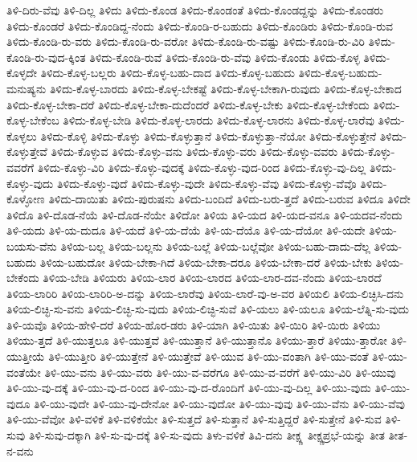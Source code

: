 {ತಿಳಿ-ದಿರು-ವೆವು
ತಿಳಿ-ದಿಲ್ಲ
ತಿಳಿದು
ತಿಳಿದು-ಕೊಂಡ
ತಿಳಿದು-ಕೊಂಡಂತೆ
ತಿಳಿದು-ಕೊಂಡದ್ದನ್ನು
ತಿಳಿದು-ಕೊಂಡರು
ತಿಳಿದು-ಕೊಂಡರೆ
ತಿಳಿದು-ಕೊಂಡಿದ್ದ-ನೆಂದು
ತಿಳಿದು-ಕೊಂಡಿ-ರ-ಬಹುದು
ತಿಳಿದು-ಕೊಂಡಿರು
ತಿಳಿದು-ಕೊಂಡಿ-ರುವ
ತಿಳಿದು-ಕೊಂಡಿ-ರು-ವರು
ತಿಳಿದು-ಕೊಂಡಿ-ರು-ವರೋ
ತಿಳಿದು-ಕೊಂಡಿ-ರು-ವಷ್ಟು
ತಿಳಿದು-ಕೊಂಡಿ-ರು-ವಿರಿ
ತಿಳಿದು-ಕೊಂಡಿ-ರು-ವುದ-ಕ್ಕಿಂತ
ತಿಳಿದು-ಕೊಂಡಿ-ರುವೆ
ತಿಳಿದು-ಕೊಂಡಿ-ರು-ವೆವು
ತಿಳಿದು-ಕೊಂಡು
ತಿಳಿದು-ಕೊಳ್ಳ
ತಿಳಿದು-ಕೊಳ್ಳದೇ
ತಿಳಿದು-ಕೊಳ್ಳ-ಬಲ್ಲರು
ತಿಳಿದು-ಕೊಳ್ಳ-ಬಹು-ದಾದ
ತಿಳಿದು-ಕೊಳ್ಳ-ಬಹುದು
ತಿಳಿದು-ಕೊಳ್ಳ-ಬಹುದು-ಮನುಷ್ಯನು
ತಿಳಿದು-ಕೊಳ್ಳ-ಬಾರದು
ತಿಳಿದು-ಕೊಳ್ಳ-ಬೇಕಷ್ಟೆ
ತಿಳಿದು-ಕೊಳ್ಳ-ಬೇಕಾಗಿ-ರುವುದು
ತಿಳಿದು-ಕೊಳ್ಳ-ಬೇಕಾದ
ತಿಳಿದು-ಕೊಳ್ಳ-ಬೇಕಾ-ದರೆ
ತಿಳಿದು-ಕೊಳ್ಳ-ಬೇಕಾ-ದುದೆಂದರೆ
ತಿಳಿದು-ಕೊಳ್ಳ-ಬೇಕು
ತಿಳಿದು-ಕೊಳ್ಳ-ಬೇಕೆಂದು
ತಿಳಿದು-ಕೊಳ್ಳ-ಬೇಕೆಂಬ
ತಿಳಿದು-ಕೊಳ್ಳ-ಬೇಡಿ
ತಿಳಿದು-ಕೊಳ್ಳ-ಲಾರದು
ತಿಳಿದು-ಕೊಳ್ಳ-ಲಾರನು
ತಿಳಿದು-ಕೊಳ್ಳ-ಲಾರೆವು
ತಿಳಿದು-ಕೊಳ್ಳಲು
ತಿಳಿದು-ಕೊಳ್ಳಿ
ತಿಳಿದು-ಕೊಳ್ಳು
ತಿಳಿದು-ಕೊಳ್ಳುತ್ತಾನೆ
ತಿಳಿದು-ಕೊಳ್ಳುತ್ತಾ-ನೆಯೋ
ತಿಳಿದು-ಕೊಳ್ಳುತ್ತೇನೆ
ತಿಳಿದು-ಕೊಳ್ಳುತ್ತೇವೆ
ತಿಳಿದು-ಕೊಳ್ಳುವ
ತಿಳಿದು-ಕೊಳ್ಳು-ವನು
ತಿಳಿದು-ಕೊಳ್ಳು-ವರು
ತಿಳಿದು-ಕೊಳ್ಳು-ವವರು
ತಿಳಿದು-ಕೊಳ್ಳು-ವವರೆಗೆ
ತಿಳಿದು-ಕೊಳ್ಳು-ವಿರಿ
ತಿಳಿದು-ಕೊಳ್ಳು-ವುದಕ್ಕೆ
ತಿಳಿದು-ಕೊಳ್ಳು-ವುದ-ರಿಂದ
ತಿಳಿದು-ಕೊಳ್ಳು-ವು-ದಿಲ್ಲ
ತಿಳಿದು-ಕೊಳ್ಳು-ವುದು
ತಿಳಿದು-ಕೊಳ್ಳು-ವುದೆ
ತಿಳಿದು-ಕೊಳ್ಳು-ವುದೇ
ತಿಳಿದು-ಕೊಳ್ಳು-ವೆವು
ತಿಳಿದು-ಕೊಳ್ಳು-ವೆವೊ
ತಿಳಿದು-ಕೊಳ್ಳೋಣ
ತಿಳಿದು-ದಾಯಿತು
ತಿಳಿದು-ಪುರುಷನು
ತಿಳಿದು-ಬಂದಿದೆ
ತಿಳಿದು-ಬರು-ತ್ತದೆ
ತಿಳಿದು-ಬರುವ
ತಿಳಿದೂ
ತಿಳಿದೇ
ತಿಳಿದೊ
ತಿಳಿ-ದೊಡ-ನೆಯೆ
ತಿಳಿ-ದೊಡ-ನೆಯೇ
ತಿಳಿದೋ
ತಿಳಿಯ
ತಿಳಿ-ಯದ
ತಿಳಿ-ಯದ-ವನೂ
ತಿಳಿ-ಯದವ-ನೆಂದು
ತಿಳಿ-ಯದು
ತಿಳಿ-ಯ-ದುದೂ
ತಿಳಿ-ಯದೆ
ತಿಳಿ-ಯ-ದೆಯೆ
ತಿಳಿ-ಯ-ದೆಯೊ
ತಿಳಿ-ಯ-ದೆಯೋ
ತಿಳಿ-ಯದೇ
ತಿಳಿಯ-ಬಯಸು-ವೆನು
ತಿಳಿಯ-ಬಲ್ಲ
ತಿಳಿಯ-ಬಲ್ಲನು
ತಿಳಿಯ-ಬಲ್ಲೆ
ತಿಳಿಯ-ಬಲ್ಲೆವೋ
ತಿಳಿಯ-ಬಹು-ದಾದು-ದೆಲ್ಲ
ತಿಳಿಯ-ಬಹುದು
ತಿಳಿಯ-ಬಹುದೋ
ತಿಳಿಯ-ಬೇಕಾ-ಗಿದೆ
ತಿಳಿಯ-ಬೇಕಾ-ದರೂ
ತಿಳಿಯ-ಬೇಕಾ-ದರೆ
ತಿಳಿಯ-ಬೇಕು
ತಿಳಿಯ-ಬೇಕೆಂದು
ತಿಳಿಯ-ಬೇಡಿ
ತಿಳಿಯರು
ತಿಳಿಯ-ಲಾರ
ತಿಳಿಯ-ಲಾರದ
ತಿಳಿಯ-ಲಾರ-ದವ-ನೆಂದು
ತಿಳಿಯ-ಲಾರದೆ
ತಿಳಿಯ-ಲಾರಿರಿ
ತಿಳಿಯ-ಲಾರಿರಿ-ಅ-ದನ್ನು
ತಿಳಿಯ-ಲಾರೆವು
ತಿಳಿಯ-ಲಾರೆ-ವು-ಅ-ವರ
ತಿಳಿಯಲಿ
ತಿಳಿಯ-ಲಿಚ್ಛಿಸಿ-ದನು
ತಿಳಿಯ-ಲಿಚ್ಛಿ-ಸು-ವನು
ತಿಳಿಯ-ಲಿಚ್ಛಿ-ಸು-ವುದು
ತಿಳಿಯ-ಲಿಚ್ಛಿ-ಸುವೆ
ತಿಳಿ-ಯಲು
ತಿಳಿ-ಯಲೂ
ತಿಳಿಯ-ಲೆತ್ನಿ-ಸು-ವುದು
ತಿಳಿ-ಯವೊ
ತಿಳಿಯ-ಹೇಳಿ-ದರೆ
ತಿಳಿಯ-ಹೊರ-ಡರು
ತಿಳಿ-ಯಾಗಿ
ತಿಳಿ-ಯಿತು
ತಿಳಿ-ಯಿರಿ
ತಿಳಿ-ಯಿರು
ತಿಳಿಯು
ತಿಳಿಯು-ತ್ತದೆ
ತಿಳಿ-ಯುತ್ತಲೂ
ತಿಳಿ-ಯುತ್ತವೆ
ತಿಳಿ-ಯುತ್ತಾನೆ
ತಿಳಿ-ಯುತ್ತಾನೊ
ತಿಳಿಯು-ತ್ತಾರೆ
ತಿಳಿಯು-ತ್ತಾರೋ
ತಿಳಿ-ಯುತ್ತೀಯೆ
ತಿಳಿ-ಯುತ್ತೀರಿ
ತಿಳಿ-ಯುತ್ತೇನೆ
ತಿಳಿ-ಯುತ್ತೇವೆ
ತಿಳಿ-ಯುವ
ತಿಳಿ-ಯು-ವಂತಾಗಿ
ತಿಳಿ-ಯು-ವಂತೆ
ತಿಳಿ-ಯು-ವಂತೆಯೇ
ತಿಳಿ-ಯು-ವನು
ತಿಳಿ-ಯು-ವರು
ತಿಳಿ-ಯು-ವ-ವರೆಗೂ
ತಿಳಿ-ಯು-ವ-ವರೆಗೆ
ತಿಳಿ-ಯು-ವಿರಿ
ತಿಳಿ-ಯುವು
ತಿಳಿ-ಯು-ವು-ದಕ್ಕೆ
ತಿಳಿ-ಯು-ವು-ದ-ರಿಂದ
ತಿಳಿ-ಯು-ವು-ದ-ರೊಂದಿಗೆ
ತಿಳಿ-ಯು-ವು-ದಿಲ್ಲ
ತಿಳಿ-ಯು-ವುದು
ತಿಳಿ-ಯು-ವುದೂ
ತಿಳಿ-ಯು-ವುದೇ
ತಿಳಿ-ಯು-ವು-ದೇನೋ
ತಿಳಿ-ಯು-ವುದೋ
ತಿಳಿ-ಯು-ವುವು
ತಿಳಿ-ಯು-ವೆನು
ತಿಳಿ-ಯು-ವೆವು
ತಿಳಿ-ಯು-ವೆವೋ
ತಿಳಿ-ವಳಿಕೆ
ತಿಳಿ-ವಳಿಕೆಯೇ
ತಿಳಿ-ಸುತ್ತದೆ
ತಿಳಿ-ಸುತ್ತಾನೆ
ತಿಳಿ-ಸುತ್ತಿದ್ದರೆ
ತಿಳಿ-ಸುತ್ತೇನೆ
ತಿಳಿ-ಸುವ
ತಿಳಿ-ಸುವು
ತಿಳಿ-ಸುವು-ದಕ್ಕಾಗಿ
ತಿಳಿ-ಸು-ವು-ದಕ್ಕೆ
ತಿಳಿ-ಸು-ವುದು
ತಿಳು-ವಳಿಕೆ
ತಿವಿ-ದನು
ತೀಕ್ಷ್ಣ
ತೀಕ್ಷ್ಣಪ್ರಭೆ-ಯನ್ನು
ತೀತ
ತೀತ-ನ-ವನು
}
